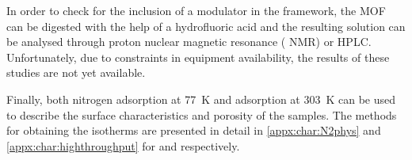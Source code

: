 In order to check for the inclusion of a modulator in the framework,
the \gls{MOF} can be digested with the help of a hydrofluoric acid and the
resulting solution can be analysed through proton nuclear magnetic
resonance ( \gls{NMR}) or \gls{HPLC}. Unfortunately, due
to constraints in equipment availability,
the results of these studies are not yet available.

Finally, both nitrogen adsorption at \SI{77}{\kelvin} and 
adsorption at \SI{303}{\kelvin} can be used to describe the surface
characteristics and porosity of the samples. The methods for obtaining
the isotherms are presented in detail in \autoref{appx:char:N2phys}
and \autoref{appx:char:highthroughput} for  and 
respectively.